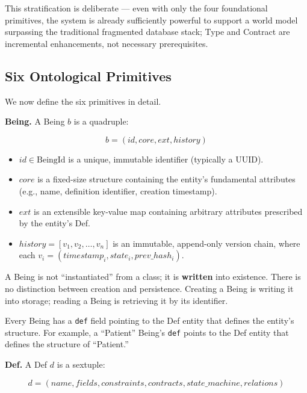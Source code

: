 \documentclass[11pt,a4paper]{article}
\begin{document}
This stratification is deliberate --- even with only the four
foundational primitives, the system is already sufficiently powerful to
support a world model surpassing the traditional fragmented database
stack; Type and Contract are incremental enhancements, not necessary
prerequisites.

\subsection{Six Ontological
Primitives}\label{six-ontological-primitives}

We now define the six primitives in detail.

\textbf{Being.} A Being \(b\) is a quadruple:

\[b = (id, core, ext, history)\]

\begin{itemize}
\tightlist
\item
  \(id \in \text{BeingId}\) is a unique, immutable identifier (typically
  a UUID).
\item
  \(core\) is a fixed-size structure containing the entity's fundamental
  attributes (e.g., name, definition identifier, creation timestamp).
\item
  \(ext\) is an extensible key-value map containing arbitrary attributes
  prescribed by the entity's Def.
\item
  \(history = [v_1, v_2, \ldots, v_n]\) is an immutable, append-only
  version chain, where each
  \(v_i = (timestamp_i, state_i, prev\_hash_i)\).
\end{itemize}

A Being is not ``instantiated'' from a class; it is \textbf{written}
into existence. There is no distinction between creation and
persistence. Creating a Being is writing it into storage; reading a
Being is retrieving it by its identifier.

Every Being has a \texttt{def} field pointing to the Def entity that
defines the entity's structure. For example, a ``Patient'' Being's
\texttt{def} points to the Def entity that defines the structure of
``Patient.''

\textbf{Def.} A Def \(d\) is a sextuple:

\[d = (name, fields, constraints, contracts, state\_machine, relations)\]
\end{document}
